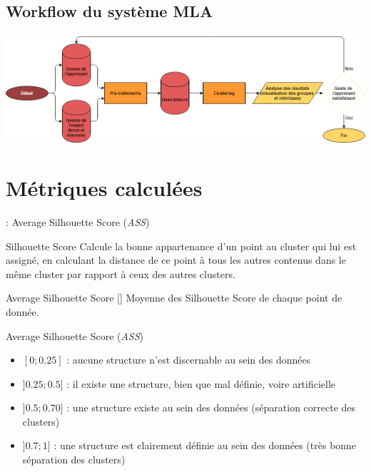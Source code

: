 \documentclass[svgnames]{beamer}
\newcommand{\mycite}[1]{[\textit{\cite{#1}}]}
\begin{document}
	\subsection{Workflow du système MLA}
	\begin{frame}{\subsecname}
	\centering
		\includegraphics[scale=0.3]{img/workflow_MLA.png}
	\end{frame}
	
	\section{Métriques calculées}
	\begin{frame}{\secname : Average Silhouette Score (\textit{ASS})}
		\begin{block}{Silhouette Score}
			Calcule la bonne appartenance d'un point au cluster qui lui est assigné, en calculant la distance de ce point à tous les autres contenus dans le même cluster par rapport à ceux des autres clusters.
		\end{block}
		
		\begin{block}{Average Silhouette Score \mycite{Rousseeuw1987Sag}}
			Moyenne des Silhouette Score de chaque point de donnée.
		\end{block}
	\end{frame}
	
	\begin{frame}{Average Silhouette Score (\textit{ASS})}
		\begin{itemize}[label=$\bullet$]
			\item $[0;0.25]$ : aucune structure n’est discernable au sein des données
			\item$ ]0.25; 0.5]$ : il existe une structure, bien que mal définie, voire artificielle
			\item $]0.5;0.70
			]$ : une structure existe au sein des données (séparation correcte des clusters)
			\item $]0.7;1]$ : une structure est clairement définie au sein des données (très bonne séparation des clusters)
		\end{itemize}
	\end{frame}
	
\end{document}
